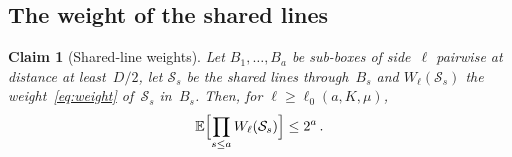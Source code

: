 \documentclass[11pt,letterpaper]{article}
\newtheorem{claim}{Claim}
\newenvironment{boxedclaim}[2]{\renewcommand{\theclaim}{#1}\begin{framed}\begin{claim}[#2]}{\end{claim}\end{framed}}
\begin{document}
\subsection{The weight of the shared lines}

\begin{boxedclaim}{C1}{Shared-line weights}
\label{claim:C1}
Let $B_1,\dots,B_a$ be sub-boxes of side~$\ell$ pairwise at distance at least~$D/2$, let $\mathcal S_s$ be the shared lines through~$B_s$ and $W_\ell(\mathcal S_s)$ the weight~\eqref{eq:weight} of~$\mathcal S_s$ in~$B_s$. Then, for $\ell\ge\ell_0(a,K,\mu)$,
\begin{equation}
\label{eq:C1}
  \mathbb E\Bigl[\prod_{s\le a}W_\ell(\mathcal S_s)\Bigr]\le2^a\,.
\end{equation}
\end{boxedclaim}
\end{document}
